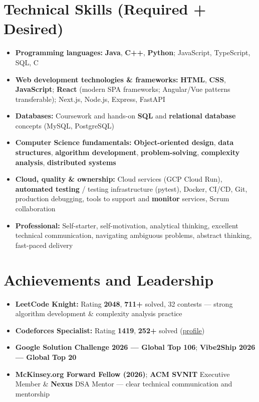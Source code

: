 \documentclass[a4paper,10pt]{article}
\begin{document}
\section{Technical Skills (Required + Desired)}
\small
\begin{itemize}[label={}]
  \item \textbf{Programming languages:} \textbf{Java}, \textbf{C++}, \textbf{Python}; JavaScript, TypeScript, SQL, C
  \item \textbf{Web development technologies \& frameworks:} \textbf{HTML}, \textbf{CSS}, \textbf{JavaScript}; \textbf{React} (modern SPA frameworks; Angular/Vue patterns transferable); Next.js, Node.js, Express, FastAPI
  \item \textbf{Databases:} Coursework and hands-on \textbf{SQL} and \textbf{relational database} concepts (MySQL, PostgreSQL)
  \item \textbf{Computer Science fundamentals:} \textbf{Object-oriented design}, \textbf{data structures}, \textbf{algorithm development}, \textbf{problem-solving}, \textbf{complexity analysis}, \textbf{distributed systems}
  \item \textbf{Cloud, quality \& ownership:} Cloud services (GCP Cloud Run), \textbf{automated testing} / testing infrastructure (pytest), Docker, CI/CD, Git, production debugging, tools to support and \textbf{monitor} services, Scrum collaboration
  \item \textbf{Professional:} Self-starter, self-motivation, analytical thinking, excellent technical communication, navigating ambiguous problems, abstract thinking, fast-paced delivery
\end{itemize}

\section{Achievements and Leadership}
\small
\begin{itemize}
  \item \textbf{LeetCode Knight:} Rating \textbf{2048}, \textbf{711+} solved, 32 contests --- strong algorithm development \& complexity analysis practice
  \item \textbf{Codeforces Specialist:} Rating \textbf{1419}, \textbf{252+} solved (\href{https://codeforces.com/profile/Oju}{profile})
  \item \textbf{Google Solution Challenge 2026 --- Global Top 106}; \textbf{Vibe2Ship 2026 --- Global Top 20}
  \item \textbf{McKinsey.org Forward Fellow (2026)}; \textbf{ACM SVNIT} Executive Member \& \textbf{Nexus} DSA Mentor --- clear technical communication and mentorship
\end{itemize}
\end{document}

